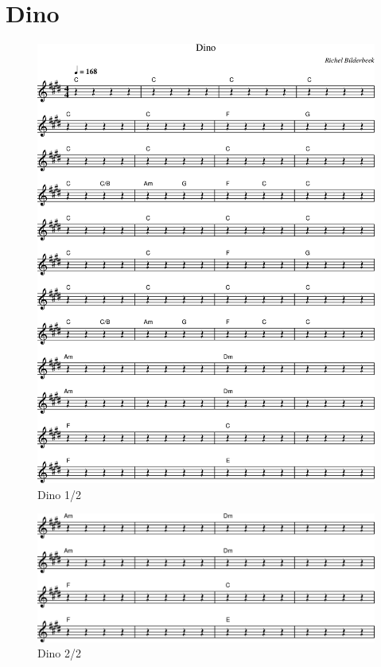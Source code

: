 \chapter{Dino}



\begin{figure}[!htbp]
  \includegraphics[width=\textwidth,height=\textheight,keepaspectratio]{../songs/65_dino-0.png}
  \caption{Dino 1/2}
  \label{fig:65_dino_1}
\end{figure}

\begin{figure}[!htbp]
  \includegraphics[width=\textwidth,height=\textheight,keepaspectratio]{../songs/65_dino-1.png}
  \caption{Dino 2/2}
  \label{fig:65_dino_2}
\end{figure}
